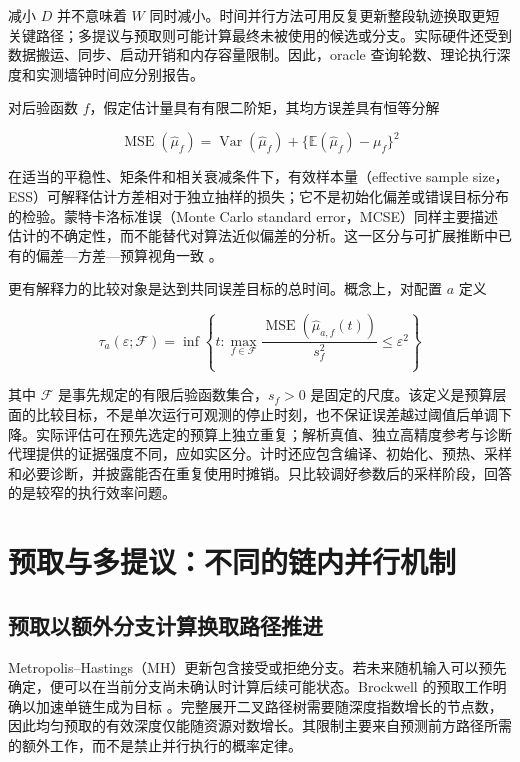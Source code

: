 \documentclass[UTF8,a4paper,zihao=-4,fontset=fandol]{ctexart}
\begin{document}
减小 $D$ 并不意味着 $W$ 同时减小。时间并行方法可用反复更新整段轨迹换取更短关键路径；多提议与预取则可能计算最终未被使用的候选或分支。实际硬件还受到数据搬运、同步、启动开销和内存容量限制。因此，oracle 查询轮数、理论执行深度和实测墙钟时间应分别报告。

对后验函数 $f$，假定估计量具有有限二阶矩，其均方误差具有恒等分解

\begin{equation}
\operatorname{MSE}(\widehat\mu_f)
=\operatorname{Var}(\widehat\mu_f)
+\{\mathbb E(\widehat\mu_f)-\mu_f\}^{2}
\label{eq:4}
\end{equation}

在适当的平稳性、矩条件和相关衰减条件下，有效样本量（effective sample size，ESS）可解释估计方差相对于独立抽样的损失；它不是初始化偏差或错误目标分布的检验。蒙特卡洛标准误（Monte Carlo standard error，MCSE）同样主要描述估计的不确定性，而不能替代对算法近似偏差的分析。这一区分与可扩展推断中已有的偏差—方差—预算视角一致 \cite{angelino2016}。

更有解释力的比较对象是达到共同误差目标的总时间。概念上，对配置 $a$ 定义

\begin{equation}
\tau_a(\varepsilon;\mathcal F)
=\inf\left\{t:\max_{f\in\mathcal F}
\frac{\operatorname{MSE}(\widehat\mu_{a,f}(t))}{s_f^2}
\leq\varepsilon^2\right\}
\label{eq:5}
\end{equation}

其中 $\mathcal F$ 是事先规定的有限后验函数集合，$s_f>0$ 是固定的尺度。该定义是预算层面的比较目标，不是单次运行可观测的停止时刻，也不保证误差越过阈值后单调下降。实际评估可在预先选定的预算上独立重复；解析真值、独立高精度参考与诊断代理提供的证据强度不同，应如实区分。计时还应包含编译、初始化、预热、采样和必要诊断，并披露能否在重复使用时摊销。只比较调好参数后的采样阶段，回答的是较窄的执行效率问题。

\section{预取与多提议：不同的链内并行机制}

\subsection{预取以额外分支计算换取路径推进}

Metropolis–Hastings（MH）更新包含接受或拒绝分支。若未来随机输入可以预先确定，便可以在当前分支尚未确认时计算后续可能状态。Brockwell 的预取工作明确以加速单链生成为目标 \cite{brockwell2006}。完整展开二叉路径树需要随深度指数增长的节点数，因此均匀预取的有效深度仅能随资源对数增长。其限制主要来自预测前方路径所需的额外工作，而不是禁止并行执行的概率定律。
\end{document}
